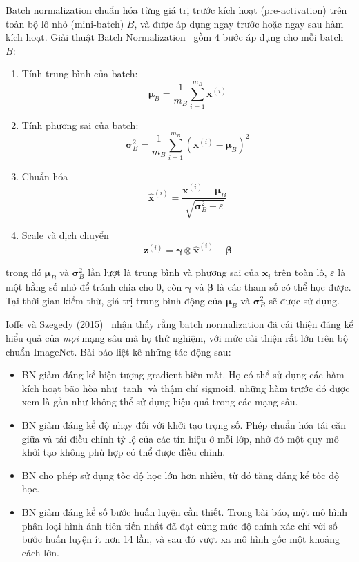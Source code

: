 \documentclass[12pt]{article}
\begin{document}
Batch normalization chuẩn hóa từng giá trị trước kích hoạt (pre-activation) trên toàn bộ lô nhỏ (mini-batch) $B$, và được áp dụng ngay trước hoặc ngay sau hàm kích hoạt. Giải thuật Batch Normalization~\cite{ioffe2015batchnorm} gồm 4 bước áp dụng cho mỗi batch $B$:
\begin{enumerate}
    \item Tính trung bình của batch:
    \[ \boldsymbol\mu_B = \frac{1}{m_B} \sum_{i = 1}^{m_B} \mathbf{x}^{(i)}\]

    \item Tính phương sai của batch:
    \[ \boldsymbol\sigma^2_B = \frac{1}{m_B} \sum_{i = 1}^{m_B} \left(\mathbf{x}^{(i)} - \boldsymbol\mu_B \right)^2\]

    \item Chuẩn hóa
    \[ \hat{\mathbf{x}}^{(i)} = \frac{\mathbf{x}^{(i)} - \boldsymbol \mu_B}{\sqrt{\boldsymbol\sigma_B^2 + \varepsilon}}\]

    \item Scale và dịch chuyển
    \[ \mathbf{z}^{(i)} = \boldsymbol\gamma \otimes \hat{\mathbf{x}}^{(i)} + \boldsymbol\beta\]
\end{enumerate}
trong đó $\boldsymbol\mu_B$ và $\boldsymbol\sigma^2_B$ lần lượt là trung bình và phương sai của $\mathbf{x}_i$ trên toàn lô, $\varepsilon$ là một hằng số nhỏ để tránh chia cho 0, còn $\boldsymbol\gamma$ và $\boldsymbol\beta$ là các tham số có thể học được. Tại thời gian kiểm thử, giá trị trung bình động của $\boldsymbol\mu_B$ và $\boldsymbol \sigma_B^2$ sẽ được sử dụng.

Ioffe và Szegedy (2015)~\cite{ioffe2015batchnorm} nhận thấy rằng batch normalization đã cải thiện đáng kể hiểu quả của \textit{mọi} mạng sâu mà họ thử nghiệm, với mức cải thiện rất lớn trên bộ chuẩn ImageNet. Bài báo liệt kê những tác động sau:
\begin{itemize}
    \item BN giảm đáng kể hiện tượng gradient biến mất. Họ có thể sử dụng các hàm kích hoạt bão hòa như $\tanh$ và thậm chí sigmoid, những hàm trước đó được xem là gần như không thể sử dụng hiệu quả trong các mạng sâu.
    \item BN giảm đáng kể độ nhạy đối với khởi tạo trọng số. Phép chuẩn hóa tái căn giữa và tái điều chỉnh tỷ lệ của các tín hiệu ở mỗi lớp, nhờ đó một quy mô khởi tạo không phù hợp có thể được điều chỉnh.
    \item BN cho phép sử dụng tốc độ học lớn hơn nhiều, từ đó tăng đáng kể tốc độ học.
    \item BN giảm đáng kể số bước huấn luyện cần thiết. Trong bài báo, một mô hình phân loại hình ảnh tiên tiến nhất đã đạt cùng mức độ chính xác chỉ với số bước huấn luyện ít hơn 14 lần, và sau đó vượt xa mô hình gốc một khoảng cách lớn.
\end{itemize}
\end{document}
